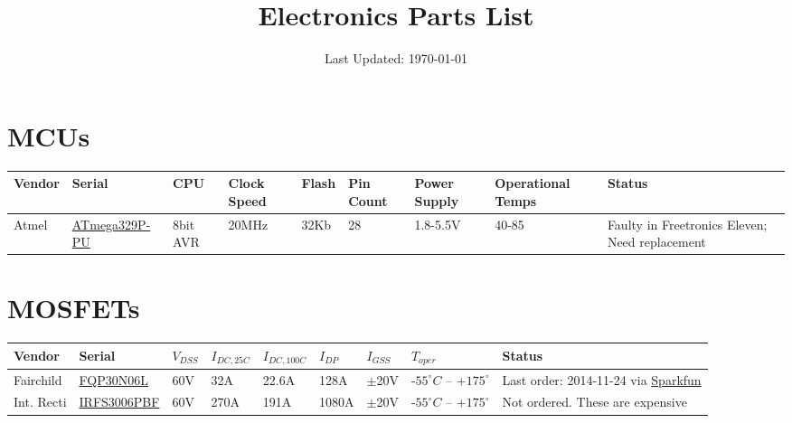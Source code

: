 \documentclass[a4paper,landscape]{article}
\title{Electronics Parts List}
\date{Last Updated: \today}
\begin{document}
  \pagestyle{fancy}
  \maketitle
  \lhead{} \rhead{}
\section{MCUs}
    {\footnotesize
    \hspace*{-6cm}\begin{tabular}{lllllllll}
    \rowcolor{gray!50}
    \hline
    \textbf{Vendor}
    & \textbf{Serial}
    & \textbf{CPU}
    & \textbf{Clock Speed}
    & \textbf{Flash}
    & \textbf{Pin Count}
    & \textbf{Power Supply}
    & \textbf{Operational Temps}
    & \textbf{Status}\\
    \hline
  Atmel
      & \href{http://www.atmel.com/devices/atmega328p.aspx}{ATmega329P-PU}
      & 8bit AVR
      & 20MHz
      & 32Kb
      & 28
      & 1.8-5.5V
      & 40-85
      & Faulty in Freetronics Eleven; Need replacement\\
  \hline
  \end{tabular}}

\section{MOSFETs}
    {\footnotesize
    \hspace*{-6cm}\begin{tabular}{lllllllll}
    \rowcolor{gray!50}
    \hline
    \textbf{Vendor}
    & \textbf{Serial}
    & \textbf{$V_{DSS}$}
    & \textbf{$I_{DC,25C}$}
    & \textbf{$I_{DC,100C}$}
    & \textbf{$I_{DP}$}
    & \textbf{$I_{GSS}$}
    & \textbf{$T_{oper}$}
    & \textbf{Status}\\
    \hline
      Fairchild
      & \href{http://dlnmh9ip6v2uc.cloudfront.net/datasheets/Components/General/FQP30N06L.pdf}{FQP30N06L}
      & 60V
      & 32A
      & 22.6A
      & 128A
      & $\pm$20V
      & -$55^{\circ}C$ -- +$175^{\circ}$
      & Last order: 2014-11-24 via \href{https://www.sparkfun.com/products/10213}{Sparkfun}\\
      Int. Recti
      & \href{http://www.irf.com/product-info/datasheets/data/irfs3006pbf.pdf}{IRFS3006PBF}
      & 60V
      & 270A
      & 191A
      & 1080A
      & $\pm$20V
      & -$55^{\circ}C$ -- +$175^{\circ}$
      & Not ordered. These are expensive\\
  \hline
  \end{tabular}}
\end{document}
